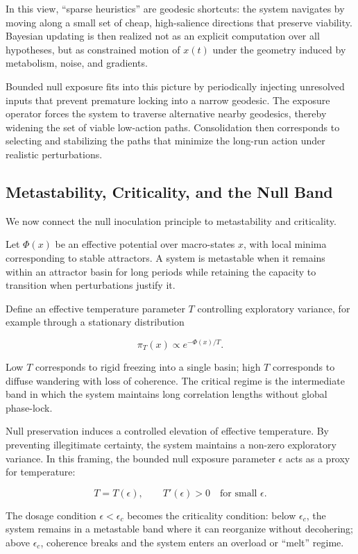 \documentclass[12pt]{article}
\begin{document}
In this view, ``sparse heuristics'' are geodesic shortcuts: the system navigates by moving along a small set of cheap, high-salience directions that preserve viability. Bayesian updating is then realized not as an explicit computation over all hypotheses, but as constrained motion of $x(t)$ under the geometry induced by metabolism, noise, and gradients.

Bounded null exposure fits into this picture by periodically injecting unresolved inputs that prevent premature locking into a narrow geodesic. The exposure operator forces the system to traverse alternative nearby geodesics, thereby widening the set of viable low-action paths. Consolidation then corresponds to selecting and stabilizing the paths that minimize the long-run action under realistic perturbations.


\subsection{Metastability, Criticality, and the Null Band}

We now connect the null inoculation principle to metastability and criticality.

Let $\Phi(x)$ be an effective potential over macro-states $x$, with local minima corresponding to stable attractors. A system is metastable when it remains within an attractor basin for long periods while retaining the capacity to transition when perturbations justify it.

Define an effective temperature parameter $T$ controlling exploratory variance, for example through a stationary distribution

\[
\pi_T(x) \propto e^{-\Phi(x)/T}.
\]

Low $T$ corresponds to rigid freezing into a single basin; high $T$ corresponds to diffuse wandering with loss of coherence. The critical regime is the intermediate band in which the system maintains long correlation lengths without global phase-lock.

Null preservation induces a controlled elevation of effective temperature. By preventing illegitimate certainty, the system maintains a non-zero exploratory variance. In this framing, the bounded null exposure parameter $\epsilon$ acts as a proxy for temperature:

\[
T = T(\epsilon),
\qquad
T'(\epsilon) > 0
\quad \text{for small } \epsilon.
\]

The dosage condition $\epsilon < \epsilon_c$ becomes the criticality condition: below $\epsilon_c$, the system remains in a metastable band where it can reorganize without decohering; above $\epsilon_c$, coherence breaks and the system enters an overload or ``melt'' regime.
\end{document}
